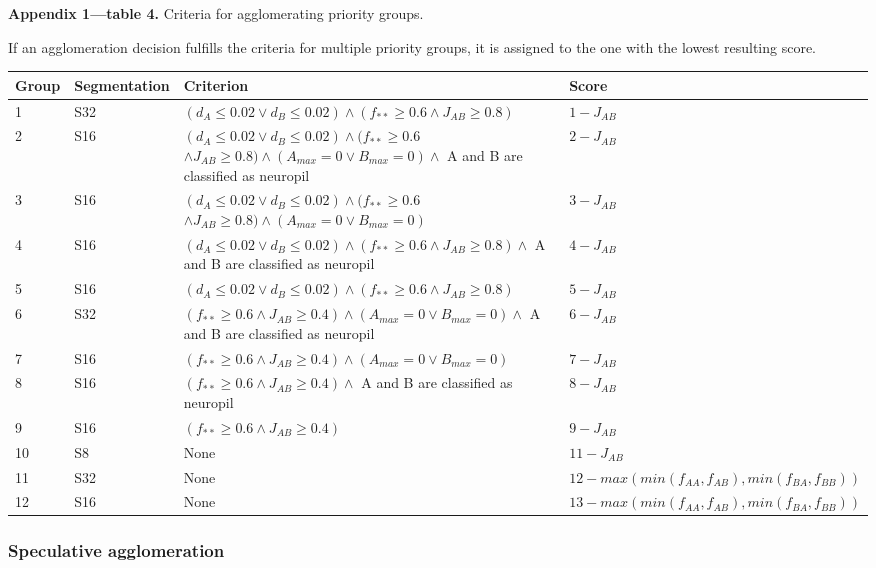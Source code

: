 \documentclass{article}
\begin{document}
\noindent \textbf{Appendix 1—table 4.} Criteria for agglomerating priority groups.

\noindent If an agglomeration decision fulfills the criteria for multiple priority groups, it is assigned to the one with the lowest resulting score.
\begin{center}\footnotesize
\begin{longtable}{llp{8cm}p{3.2cm}}
\textbf{Group} & \textbf{Segmentation} & \textbf{Criterion} & \textbf{Score} \\
\hline
1 & S32 & $(d_A \leq 0.02 \vee d_B \leq 0.02) \wedge (f_{**} \geq 0.6 \wedge J_{AB} \geq 0.8)$ & $1 - J_{AB}$ \\
2 & S16 & $(d_A \leq 0.02 \vee d_B \leq 0.02) \wedge (f_{**} \geq 0.6$ $\wedge J_{AB} \geq 0.8) \wedge (A_{max} = 0 \vee B_{max} = 0) \wedge$ A and B are classified as neuropil & $2 - J_{AB}$ \\
3 & S16 & $(d_A \leq 0.02 \vee d_B \leq 0.02) \wedge (f_{**} \geq 0.6$ $\wedge J_{AB} \geq 0.8) \wedge (A_{max} = 0 \vee B_{max} = 0)$ & $3 - J_{AB}$ \\
4 & S16 & $(d_A \leq 0.02 \vee d_B \leq 0.02) \wedge (f_{**} \geq 0.6 \wedge J_{AB} \geq 0.8) \wedge$ A and B are classified as neuropil & $4 - J_{AB}$ \\
5 & S16 & $(d_A \leq 0.02 \vee d_B \leq 0.02) \wedge (f_{**} \geq 0.6 \wedge J_{AB} \geq 0.8)$ & $5 - J_{AB}$ \\
6 & S32 & $(f_{**} \geq 0.6 \wedge J_{AB} \geq 0.4) \wedge (A_{max} = 0 \vee B_{max} = 0) \wedge$ A and B are classified as neuropil & $6 - J_{AB}$ \\
7 & S16 & $(f_{**} \geq 0.6 \wedge J_{AB} \geq 0.4) \wedge (A_{max} = 0 \vee B_{max} = 0)$ & $7 - J_{AB}$ \\
8 & S16 & $(f_{**} \geq 0.6 \wedge J_{AB} \geq 0.4) \wedge$ A and B are classified as neuropil & $8 - J_{AB}$ \\
9 & S16 & $(f_{**} \geq 0.6 \wedge J_{AB} \geq 0.4)$ & $9 - J_{AB}$ \\
10 & S8 & None & $11 - J_{AB}$ \\
11 & S32 & None & $12 - max(min(f_{AA}, f_{AB}), min(f_{BA}, f_{BB}))$ \\
12 & S16 & None & $13 - max(min(f_{AA}, f_{AB}), min(f_{BA}, f_{BB}))$ \\
\end{longtable}
\end{center}


\subsubsection*{Speculative agglomeration}
\end{document}
